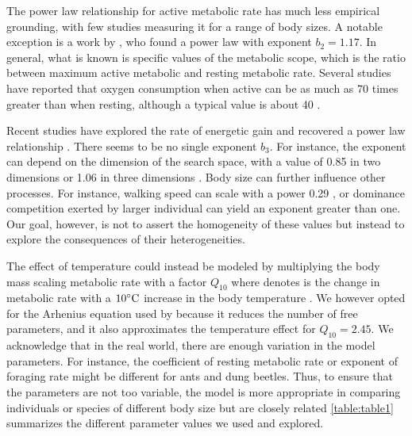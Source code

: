The power law relationship for active metabolic rate has much less empirical grounding, with few studies measuring it for a range of body sizes.
A notable exception is a work by \citet{Bartholomew1978}, who found a power law with exponent $b_2 = 1.17$.
In general, what is known is specific values of the metabolic scope, which is the ratio between maximum active metabolic and resting metabolic rate.
Several studies have reported that oxygen consumption when active can be as much as 70 times greater than when resting, although a typical value is about 40 \citep{Bartholomew1981}.  

Recent studies have explored the rate of energetic gain and recovered a power law relationship \citep{Pawar2012, Maino2015}.
There seems to be no single exponent $b_3$.
For instance, the exponent can depend on the dimension of the search space, with a value of 0.85 in two dimensions or 1.06 in three dimensions \citep{Pawar2012}.
Body size can further influence other processes.
For instance, walking speed  can scale with a power 0.29 \citep{Peters1986}, or dominance competition exerted by larger individual can yield an exponent greater than one.  %
Our goal, however, is not to assert the homogeneity of these values but instead to explore the consequences of their heterogeneities.

The effect of temperature could instead be modeled by multiplying the body mass scaling metabolic rate with a factor $Q_{10}$ where denotes is the change in metabolic rate with a $10^ {\circ} \rm{C}$ increase in the body temperature \citep{Precht1973}.
We however opted for the Arhenius equation used by \citet{Brown2004} because it reduces the number of free parameters, and it also approximates the temperature effect for $Q_{10} = 2.45$.  
We acknowledge that in the real world, there are enough variation in the model parameters.
For instance, the coefficient of resting metabolic rate or exponent of foraging rate might be different for ants and dung beetles.
Thus, to ensure that the parameters are not too variable, the model is more appropriate in comparing individuals or species of different body size but are closely related %
\cref{table:table1} summarizes the different parameter values we used and explored.

